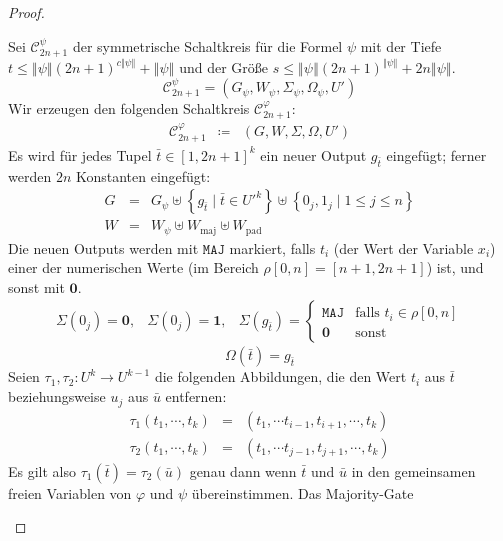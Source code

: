 \begin{proof}
\begin{casenv}
Sei $\mathcal{C}_{2n+1}^{\psi}$ der symmetrische Schaltkreis für
die Formel $\psi$ mit der Tiefe $t\leqslant\left\Vert \psi\right\Vert \left(2n+1\right)^{c\left\Vert \psi\right\Vert }+\left\Vert \psi\right\Vert $
und der Größe $s\leqslant\left\Vert \psi\right\Vert \left(2n+1\right)^{\left\Vert \psi\right\Vert }+2n\left\Vert \psi\right\Vert $.
\[
\mathcal{C}_{2n+1}^{\psi}=\left(G_{\psi},W_{\psi},\Sigma_{\psi},\Omega_{\psi},U'\right)
\]
Wir erzeugen den folgenden Schaltkreis $\mathcal{C}_{2n+1}^{\varphi}$:
\begin{eqnarray*}
\mathcal{C}_{2n+1}^{\varphi} & \coloneqq & \left(G,W,\Sigma,\Omega,U'\right)
\end{eqnarray*}
Es wird für jedes Tupel $\bar{t}\in\left[1,2n+1\right]^{k}$ ein neuer
Output $g_{\bar{t}}$ eingefügt; ferner werden $2n$ Konstanten eingefügt:
\begin{eqnarray*}
G & = & G_{\psi}\uplus\left\{ g_{\bar{t}}\mid\bar{t}\in U'^{k}\right\} \uplus\left\{ 0_{j},1_{j}\mid1\leqslant j\leqslant n\right\} \\
W & = & W_{\psi}\uplus W_{\mathrm{maj}}\uplus W_{\mathrm{pad}}
\end{eqnarray*}
Die neuen Outputs werden mit $\mathtt{MAJ}$ markiert, falls $t_{i}$
(der Wert der Variable $x_{i}$) einer der numerischen Werte (im Bereich
$\rho\left[0,n\right]=\left[n+1,2n+1\right]$) ist, und sonst mit
$\mathbf{0}$. 
\[
\begin{array}{ccc}
\Sigma\left(0_{j}\right)=\mathbf{0}, & \Sigma\left(0_{j}\right)=\mathbf{1}, & \Sigma\left(g_{\bar{t}}\right)=\begin{cases}
\mathtt{MAJ} & \mathrm{falls}\,\,t_{i}\in\rho\left[0,n\right]\\
\mathbf{0} & \mathrm{sonst}
\end{cases}\end{array}
\]
\[
\Omega\left(\bar{t}\right)=g_{\bar{t}}
\]
Seien $\tau_{1},\tau_{2}:U^{k}\rightarrow U^{k-1}$ die folgenden
Abbildungen, die den Wert $t_{i}$ aus $\bar{t}$ beziehungsweise
$u_{j}$ aus $\bar{u}$ entfernen:
\begin{eqnarray*}
\tau_{1}\left(t_{1},\cdots,t_{k}\right) & = & \left(t_{1},\cdots t_{i-1},t_{i+1},\cdots,t_{k}\right)\\
\tau_{2}\left(t_{1},\cdots,t_{k}\right) & = & \left(t_{1},\cdots t_{j-1},t_{j+1},\cdots,t_{k}\right)
\end{eqnarray*}
Es gilt also $\tau_{1}\left(\bar{t}\right)=\tau_{2}\left(\bar{u}\right)$
genau dann wenn $\bar{t}$ und $\bar{u}$ in den gemeinsamen freien
Variablen von $\varphi$ und $\psi$ übereinstimmen. Das Majority-Gate

\end{casenv}
\end{proof}

